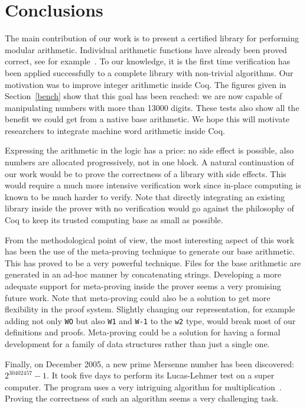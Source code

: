 \section{Conclusions}


The main contribution of our work is to present a certified library for performing
modular arithmetic. Individual arithmetic functions have already been proved correct,
see for example~\cite{BerMagZim02}. To our knowledge, it is the first time verification
has been applied successfully to a complete library  with non-trivial algorithms.
Our motivation was to improve integer arithmetic inside {\sc Coq}. The figures given in Section~\ref{bench} 
show that this goal has been reached: we are now capable of manipulating numbers with more than 13000 digits.
These tests also show all the benefit we could get from a native base arithmetic. We hope this will motivate 
researchers to integrate machine word arithmetic inside {\sc Coq}.

Expressing the arithmetic in the logic has a price: no side effect is possible, 
also numbers are allocated progressively, not in one block.
A natural continuation of our work would be to prove the correctness of a library with side effects.
This would require a much more intensive verification work since in-place computing
is known to be much harder to verify.
Note that directly integrating an existing library inside the prover with no verification
would go against the philosophy of {\sc Coq} to keep its trusted computing base as small
as possible.

From the methodological point of view, the most interesting aspect of this work
has been the use of the meta-proving technique to generate our base arithmetic. This has proved
to be a very powerful technique. Files for the base arithmetic are generated in an ad-hoc manner
by concatenating strings. Developing a more adequate support for meta-proving inside the prover seems a
very promising future work. Note that meta-proving could also be a solution to get more flexibility
in the proof system. Slightly changing our representation, for example adding not only {\tt WO}
but also {\tt W1} and {\tt W-1} to  the {\tt w2} type, would break most of our definitions and proofs.
Meta-proving could be a solution for having a formal development for a family of data structures rather than
just a single one.

Finally, on December 2005, a new prime Mersenne number has been discovered: $2 ^{30402457} - 1$.
It took five days to  perform its Lucas-Lehmer test on a super computer. 
The program uses a very intriguing algorithm for 
multiplication~\cite{crandall}. 
Proving the correctness of
such an algorithm seems a very challenging task. 
